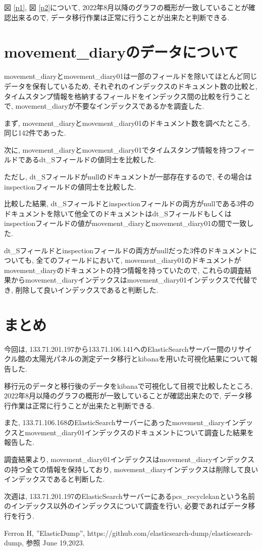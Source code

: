 \documentclass[a4j,12pt,]{jarticle}
\begin{document}
図 \ref{p1}, 図 \ref{p2}について, 2022年8月以降のグラフの概形が一致していることが確認出来るので, データ移行作業は正常に行うことが出来たと判断できる.

\section{movement\_diaryのデータについて}
movement\_diaryとmovement\_diary01は一部のフィールドを除いてほとんど同じデータを保有しているため, それぞれのインデックスのドキュメント数の比較と, タイムスタンプ情報を格納するフィールドをインデックス間の比較を行うことで, movement\_diaryが不要なインデックスであるかを調査した.

まず, movement\_diaryとmovement\_diary01のドキュメント数を調べたところ, 同じ142件であった.

次に, movement\_diaryとmovement\_diary01でタイムスタンプ情報を持つフィールドであるdt\_Sフィールドの値同士を比較した.

ただし, dt\_Sフィールドがnullのドキュメントが一部存在するので, その場合はinspectionフィールドの値同士を比較した.

比較した結果, dt\_Sフィールドとinspectionフィールドの両方がnullである3件のドキュメントを除いて他全てのドキュメントはdt\_Sフィールドもしくはinspectionフィールドの値がmovement\_diaryとmovement\_diary01の間で一致した.

dt\_Sフィールドとinspectionフィールドの両方がnullだった3件のドキュメントについても, 全てのフィールドにおいて, movement\_diary01のドキュメントがmovement\_diaryのドキュメントの持つ情報を持っていたので, これらの調査結果からmovement\_diaryインデックスはmovement\_diary01インデックスで代替でき, 削除して良いインデックスであると判断した.

\section{まとめ}
今回は, 133.71.201.197から133.71.106.141へのElasticSearchサーバー間のリサイクル館の太陽光パネルの測定データ移行とkibanaを用いた可視化結果について報告した.

移行元のデータと移行後のデータをkibanaで可視化して目視で比較したところ, 2022年8月以降のグラフの概形が一致していることが確認出来たので, データ移行作業は正常に行うことが出来たと判断できる.

また, 133.71.106.168のElasticSearchサーバーにあったmovement\_diaryインデックスとmovement\_diary01インデックスのドキュメントについて調査した結果を報告した.

調査結果より, movement\_diary01インデックスはmovement\_diaryインデックスの持つ全ての情報を保持しており, movement\_diaryインデックスは削除して良いインデックスであると判断した.

次週は, 133.71.201.197のElasticSearchサーバーにあるpcs\_recyclekanという名前のインデックス以外のインデックスについて調査を行い, 必要であればデータ移行を行う.

\begin{thebibliography}{5}
  Ferron H, ”ElasticDump”, https://github.com/elasticsearch-dump/elasticsearch-dump, 参照 June 19,2023.
\end{thebibliography}
\end{document}
